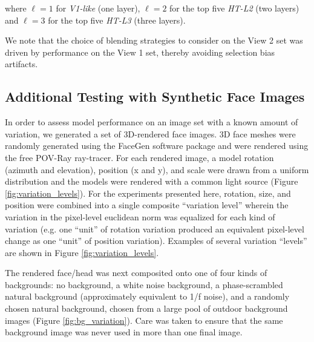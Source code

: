 where $\ell=1$ for
\emph{V1-like} (one layer), $\ell=2$ for the top five \emph{HT-L2} (two layers)
and $\ell=3$ for the top five \emph{HT-L3} (three layers).

We note that the choice of blending strategies to consider on the View 2 set was 
driven by performance on the View 1 set, thereby avoiding selection bias artifacts.

\subsection{Additional Testing with Synthetic Face Images}
\label{synthetic_methods}

In order to assess model performance on an image set with a known amount of variation, 
we generated a set of 3D-rendered face images.  3D face meshes were randomly generated
using the FaceGen software package and were rendered using
the free POV-Ray ray-tracer.  For each rendered image, a model rotation 
(azimuth and elevation), position (x and y), and scale were drawn from a uniform 
distribution and the models were rendered with a common light source (Figure \ref{fig:variation_levels}).  
For the experiments presented here, rotation, size, and position were combined into
a single composite ``variation level'' wherein the variation in the pixel-level euclidean norm
was equalized for each kind of variation (e.g. one ``unit'' of rotation variation produced an
equivalent pixel-level change as one ``unit'' of position variation).  Examples of several
variation ``levels'' are shown in Figure \ref{fig:variation_levels}.

The rendered face/head was next composited onto one of four kinds of backgrounds: no
background, a white noise background, a phase-scrambled natural background 
(approximately equivalent to 1/f noise), and a randomly chosen natural background, chosen from
a large pool of outdoor background images (Figure \ref{fig:bg_variation}).  Care was taken 
to ensure that the same background image was never used in more than one final image.

